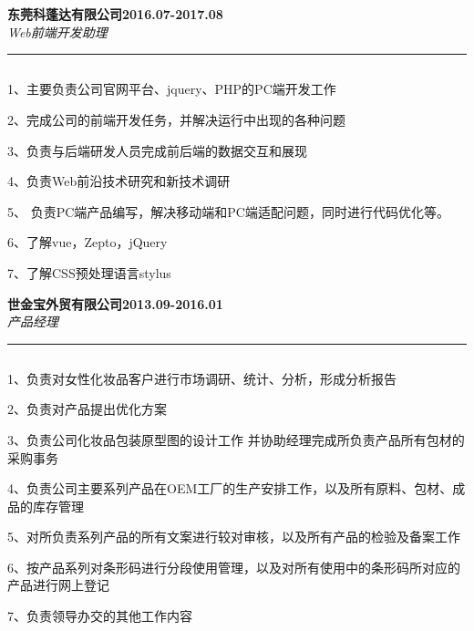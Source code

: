 \documentclass[11pt]{article} %
\begin{document}
 \section{\textsc{}}
 
\large{\textbf{东莞科蓬达有限公司\hfill 2016.07-2017.08}}\\
\normalsize
\indent\textit{Web前端开发助理 \hfill  }
\hrule\smallskip\vspace{-4mm}
 \begin{description}
  \setlength{\itemsep}{1pt}
  \setlength{\parskip}{0pt}
  \setlength{\parsep}{1pt}
  \item[工作描述:]$ $\\\vspace{-4mm}

1、主要负责公司官网平台、jquery、PHP的PC端开发工作

2、完成公司的前端开发任务，并解决运行中出现的各种问题

3、负责与后端研发人员完成前后端的数据交互和展现

4、负责Web前沿技术研究和新技术调研

5、 负责PC端产品编写，解决移动端和PC端适配问题，同时进行代码优化等。

6、了解vue，Zepto，jQuery

7、了解CSS预处理语言stylus
  \end{description}

\large{\textbf{世金宝外贸有限公司\hfill 2013.09-2016.01}}\\
\normalsize
\indent\textit{产品经理 \hfill  }
  \hrule\smallskip\vspace{-4mm}
 \begin{description}
  \setlength{\itemsep}{1pt}
  \setlength{\parskip}{0pt}
  \setlength{\parsep}{1pt}
  \item[工作描述:]$ $\\\vspace{-4mm}

1、负责对女性化妆品客户进行市场调研、统计、分析，形成分析报告

2、负责对产品提出优化方案

3、负责公司化妆品包装原型图的设计工作 并协助经理完成所负责产品所有包材的采购事务

4、负责公司主要系列产品在OEM工厂的生产安排工作，以及所有原料、包材、成品的库存管理

5、对所负责系列产品的所有文案进行较对审核，以及所有产品的检验及备案工作

6、按产品系列对条形码进行分段使用管理，以及对所有使用中的条形码所对应的产品进行网上登记

7、负责领导办交的其他工作内容


  \end{description}
  
\end{document}
